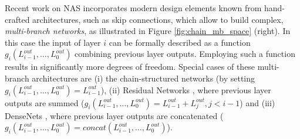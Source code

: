 \documentclass[twoside,11pt]{article}
\newcommand{\layer}[1]{L_{#1} }
\newcommand{\layerinput}{g}
\begin{document}
Recent work on NAS \citep{DBLP:journals/corr/abs-1708-05344,elsken_simple_2017,DBLP:journals/corr/ZophVSL17,elsken_multi_2018, real_regularized_2018,cai_path-level_2018} incorporates modern design elements known from hand-crafted architectures, such as skip connections, which allow to build complex, \emph{multi-branch networks}, as illustrated in Figure \ref{fig:chain_mb_space} (right). In this case the input of layer $i$ can be formally described as a function $\layerinput_i(\layer{i-1}^{out}, \dots , \layer{0}^{out})$ combining previous layer outputs. Employing such a function results in significantly more degrees of freedom. Special cases of these multi-branch architectures are (i) the chain-structured networks (by setting $\layerinput_i(\layer{i-1}^{out}, \dots , \layer{0}^{out}) = \layer{i-1}^{out}$), (ii) Residual Networks \citep{he_deep_2015}, where previous layer outputs are summed  ($\layerinput_i(\layer{i-1}^{out}, \dots , \layer{0}^{out}) = \layer{i-1}^{out}+\layer{j}^{out},j<i-1$) and (iii) DenseNets \citep{huang_densely_2016}, where previous layer outputs are concatenated ($\layerinput_i(\layer{i-1}^{out}, \dots , \layer{0}^{out}) = concat( \layer{i-1}^{out}, \dots , \layer{0}^{out})$).
\end{document}
